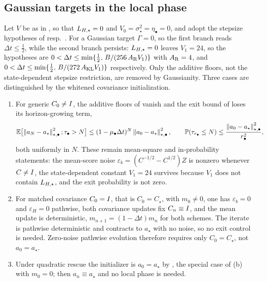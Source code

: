 \subsection{Gaussian targets in the local phase}

\begin{corollary}
\label{cor:stoch-loc-Gauss}
Let $V$ be as in , so that $L_{H,\star}=0$ and $V_0=\sigma_\star^2=\eta_\bullet=0$,
and adopt the stepsize hypotheses of  resp.\ . For a
Gaussian target $\Gamma=0$, so the first branch reads $\Delta t\leq\tfrac12$, while the second
branch persists: $L_{H,\star}=0$ leaves $V_1=24$, so the hypotheses are
$0<\Delta t\leq\min\{\tfrac12,\,B/(256\,A_{\mathrm{R}}V_1)\}$ with $A_{\mathrm{R}}=4$, and
$0<\Delta t\leq\min\{\tfrac12,\,B/(272\,A_{\mathrm{KL}}V_1)\}$ respectively. Only the additive floors, not
the state-dependent stepsize restriction, are removed by Gaussianity. Three cases are
distinguished by the whitened covariance initialization.
\begin{enumerate}
\item[(a)] For generic $C_0\neq I$, the additive floors of
 vanish and the exit bound of  loses
its horizon-growing term,
\[
    \mathbb{E}\bigl[\left\lVert a_N-a_\star\right\rVert_{\star,\bullet}^2;\tau_\bullet>N\bigr]\leq(1-\mu_\bullet\Delta t)^N\left\lVert a_0-a_\star\right\rVert_{\star,\bullet}^2,
    \qquad
    \mathbb{P}(\tau_{r_\bullet}\leq N)\leq\frac{\left\lVert a_0-a_\star\right\rVert_{\star,\bullet}^2}{r_\bullet^2},
\]
both uniformly in $N$. These remain mean-square and in-probability statements: the mean-score noise
$\varepsilon_b=(C^{-1/2}-C^{1/2})Z$ is nonzero whenever $C\neq I$, the state-dependent constant
$V_1=24$ survives because $V_1$ does not contain $L_{H,\star}$, and the exit probability is not zero.
\item[(b)] For matched covariance $C_0=I$, that is $C_0=C_\star$, with $m_0\neq0$, one has
$\varepsilon_b=0$ and $\varepsilon_H=0$ pathwise, both covariance updates fix $C_n\equiv I$, and the
mean update is deterministic, $m_{n+1}=(1-\Delta t)m_n$ for both schemes. The iterate is pathwise
deterministic and contracts to $a_\star$ with no noise, so no exit control is needed. Zero-noise
pathwise evolution therefore requires only $C_0=C_\star$, not $a_0=a_\star$.
\item[(c)] Under quadratic rescue the initializer is $a_0=a_\star$ by , the
special case of (b) with $m_0=0$; then $a_n\equiv a_\star$ and no local phase is needed.
\end{enumerate}
\end{corollary}

